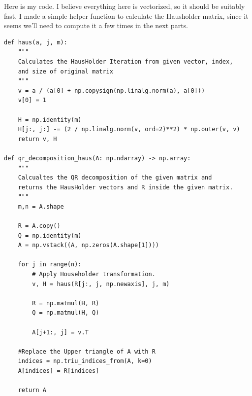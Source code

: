 \begin{solution}

    Here is my code. I believe everything here is vectorized, so it should be suitably fast. I made a simple helper function to calculate the Hausholder matrix, since it seems we'll need to compute it a few times in the next parts.

\begin{lstlisting}
def haus(a, j, m):
    """
    Calculates the HausHolder Iteration from given vector, index, 
    and size of original matrix 
    """
    v = a / (a[0] + np.copysign(np.linalg.norm(a), a[0]))
    v[0] = 1

    H = np.identity(m)
    H[j:, j:] -= (2 / np.linalg.norm(v, ord=2)**2) * np.outer(v, v)
    return v, H

def qr_decomposition_haus(A: np.ndarray) -> np.array:
    """
    Calcualtes the QR decomposition of the given matrix and 
    returns the HausHolder vectors and R inside the given matrix.
    """
    m,n = A.shape
    
    R = A.copy()
    Q = np.identity(m)
    A = np.vstack((A, np.zeros(A.shape[1])))
    
    for j in range(n):
        # Apply Householder transformation.
        v, H = haus(R[j:, j, np.newaxis], j, m)
        
        R = np.matmul(H, R)
        Q = np.matmul(H, Q)
        
        A[j+1:, j] = v.T
    
    #Replace the Upper triangle of A with R
    indices = np.triu_indices_from(A, k=0)
    A[indices] = R[indices]
    
    return A
\end{lstlisting}
\end{solution}

\newpage
